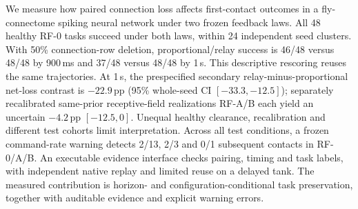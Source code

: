 We measure how paired connection loss affects first-contact outcomes in a fly-connectome spiking neural network under two frozen feedback laws. All 48 healthy RF-0 tasks succeed under both laws, within 24 independent seed clusters. With 50\% connection-row deletion, proportional/relay success is 46/48 versus 48/48 by 900\,ms and 37/48 versus 48/48 by 1\,s. This descriptive rescoring reuses the same trajectories. At 1\,s, the prespecified secondary relay-minus-proportional net-loss contrast is $-22.9$\,pp (95\% whole-seed CI $[-33.3,-12.5]$); separately recalibrated same-prior receptive-field realizations RF-A/B each yield an uncertain $-4.2$\,pp $[-12.5,0]$. Unequal healthy clearance, recalibration and different test cohorts limit interpretation. Across all test conditions, a frozen command-rate warning detects 2/13, 2/3 and 0/1 subsequent contacts in RF-0/A/B. An executable evidence interface checks pairing, timing and task labels, with independent native replay and limited reuse on a delayed tank. The measured contribution is horizon- and configuration-conditional task preservation, together with auditable evidence and explicit warning errors.
